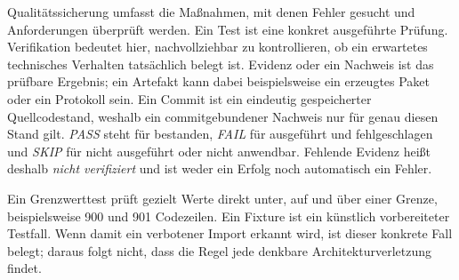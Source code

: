 \begin{beginnerstatement}

Qualitätssicherung umfasst die Maßnahmen, mit denen Fehler gesucht und
Anforderungen überprüft werden. Ein Test ist eine konkret ausgeführte Prüfung.
Verifikation bedeutet hier, nachvollziehbar zu kontrollieren, ob ein erwartetes
technisches Verhalten tatsächlich belegt ist. Evidenz oder ein Nachweis ist
das prüfbare Ergebnis; ein Artefakt kann dabei beispielsweise ein erzeugtes
Paket oder ein Protokoll sein. Ein Commit ist ein eindeutig gespeicherter
Quellcodestand, weshalb ein commitgebundener Nachweis nur für genau diesen
Stand gilt. \emph{PASS} steht für bestanden, \emph{FAIL} für ausgeführt und
fehlgeschlagen und \emph{SKIP} für nicht ausgeführt oder nicht anwendbar.
Fehlende Evidenz heißt deshalb \emph{nicht verifiziert} und ist weder ein
Erfolg noch automatisch ein Fehler.

Ein Grenzwerttest prüft gezielt Werte direkt unter, auf und über einer Grenze,
beispielsweise 900 und 901 Codezeilen. Ein Fixture ist ein künstlich
vorbereiteter Testfall. Wenn damit ein verbotener Import erkannt wird, ist
dieser konkrete Fall belegt; daraus folgt nicht, dass die Regel jede denkbare
Architekturverletzung findet.

\end{beginnerstatement}
